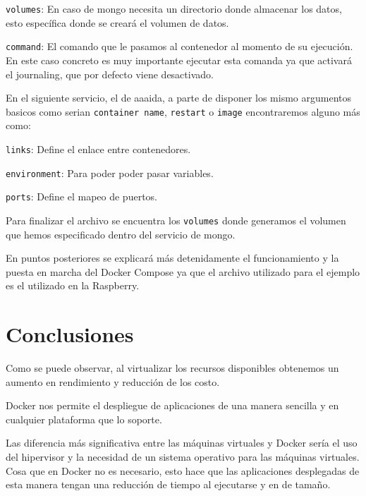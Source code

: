 \texttt{volumes}: En caso de mongo necesita un directorio donde almacenar los datos, esto específica donde se creará el volumen de datos.

\texttt{command}:  El comando que le pasamos al contenedor al momento de su ejecución. En este caso concreto es muy importante ejecutar esta comanda ya que activará el journaling, que por defecto viene desactivado.
\pagebreak

En el siguiente servicio, el de aaaida, a parte de disponer los mismo argumentos basicos como serian \texttt{container name}, \texttt{restart} o \texttt{image} encontraremos alguno más como:

\texttt{links}: Define el enlace entre contenedores.

\texttt{environment}: Para poder poder pasar variables.

\texttt{ports}: Define el mapeo de puertos.

Para finalizar el archivo se encuentra los \texttt{volumes} donde generamos el volumen que hemos especificado dentro del servicio de mongo.  

En puntos posteriores se explicará más detenidamente el funcionamiento y la puesta en marcha del Docker Compose ya que el archivo utilizado para el ejemplo es el utilizado en la Raspberry.

\section{Conclusiones}

Como se puede observar, al virtualizar los recursos disponibles obtenemos un aumento en rendimiento y reducción de los costo. 

Docker nos permite el despliegue de aplicaciones de una manera sencilla y en cualquier plataforma que lo soporte. 

Las diferencia más significativa entre las máquinas virtuales y Docker sería el uso del hipervisor y la necesidad de un sistema operativo para las máquinas virtuales. Cosa que en Docker no es necesario, esto hace que las aplicaciones desplegadas de esta manera tengan una reducción de tiempo al ejecutarse y en de tamaño.  
